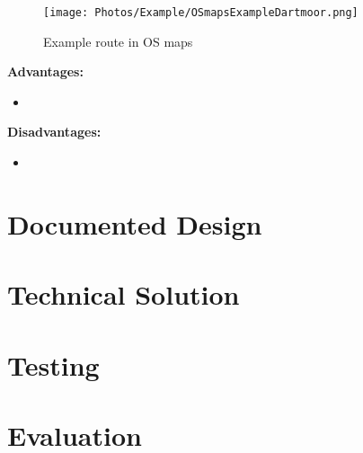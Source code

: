 \documentclass{article}
\newcommand{\Adv}{\bigskip\textbf{Advantages: }}
\newcommand{\Dis}{\bigskip\textbf{Disadvantages: }}
\begin{document}
            \begin{figure}[ht]
                \centering
                \texttt{[image: Photos/Example/OSmapsExampleDartmoor.png]}
                \caption{Example route in OS maps}
                \label{fig:os-maps-example}
            \end{figure}

            \Adv
            \begin{itemize}
                \item 
            \end{itemize}

            \Dis
            \begin{itemize}
                \item 
            \end{itemize}
        
\newpage

\section{Documented Design}

    

\newpage
    
\section{Technical Solution}

    

\newpage

\section{Testing}

    

\newpage

\section{Evaluation}

    
    
\end{document}

